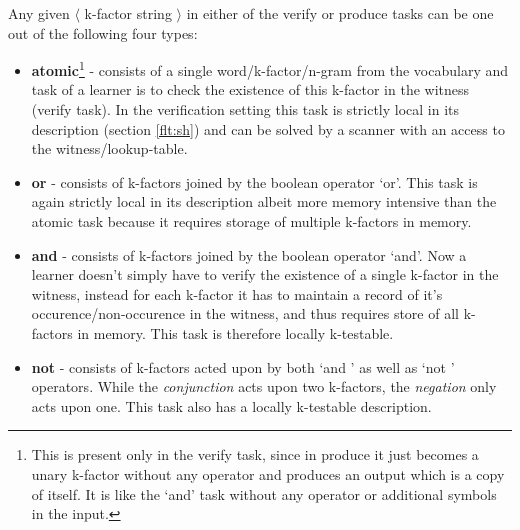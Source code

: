 Any given $\langle$ k-factor string $\rangle$ in either of the verify or produce tasks can be one out of the following four types:
\begin{itemize}
	\item \textbf{atomic}\footnote{This is present only in the verify task, since in produce it just becomes a unary k-factor without any operator and produces an output which is a copy of itself. It is like the \lq and\rq{} task without any operator or additional symbols in the input.} - consists of a single word/k-factor/n-gram from the vocabulary and task of a learner is to check the existence of this k-factor in the witness (verify task). In the verification setting this task is strictly local in its description (section \ref{flt:sh}) and can be solved by a scanner with an access to the witness/lookup-table.
	\item \textbf{or} - consists of k-factors joined by the boolean operator \lq or\rq{}. This task is again strictly local in its description albeit more memory intensive than the atomic task because it requires storage of multiple k-factors in memory.
	\item \textbf{and} - consists of k-factors joined by the boolean operator \lq and\rq{}. Now a learner doesn't simply have to verify the existence of a single k-factor in the witness, instead for each k-factor it has to maintain a record of it's occurence/non-occurence in the witness, and thus requires store of all k-factors in memory. This task is therefore locally k-testable. 
	\item \textbf{not} - consists of k-factors acted upon by both \lq and \rq{} as well as \lq not \rq{} operators. While the \textit{conjunction} acts upon two k-factors, the \textit{negation} only acts upon one. This task also has a locally k-testable description. 
\end{itemize}




